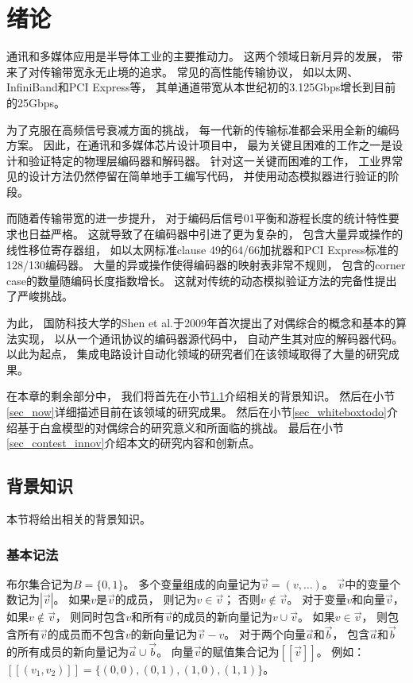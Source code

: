 \chapter{绪论}
\label{chap:1}

通讯和多媒体应用是半导体工业的主要推动力。
这两个领域日新月异的发展，
带来了对传输带宽永无止境的追求。
常见的高性能传输协议，
如以太网、InfiniBand和PCI Express等，
其单通道带宽从本世纪初的3.125Gbps增长到目前的25Gbps。

为了克服在高频信号衰减方面的挑战，
每一代新的传输标准都会采用全新的编码方案。
因此，在通讯和多媒体芯片设计项目中，
最为关键且困难的工作之一是设计和验证特定的物理层编码器和解码器。
针对这一关键而困难的工作，
工业界常见的设计方法仍然停留在简单地手工编写代码，
并使用动态模拟器进行验证的阶段。

而随着传输带宽的进一步提升，
对于编码后信号01平衡和游程长度的统计特性要求也日益严格。
这就导致了在编码器中引进了更为复杂的，
包含大量异或操作的线性移位寄存器组，
如以太网标准clause 49的64/66加扰器和PCI Express标准的128/130编码器。
大量的异或操作使得编码器的映射表非常不规则，
包含的corner case的数量随编码长度指数增长。
这就对传统的动态模拟验证方法的完备性提出了严峻挑战。

为此，
国防科技大学的Shen et al.于2009年首次提出了对偶综合的概念和基本的算法实现，
以从一个通讯协议的编码器源代码中，
自动产生其对应的解码器代码。
以此为起点，
集成电路设计自动化领域的研究者们在该领域取得了大量的研究成果。

在本章的剩余部分中，
我们将首先在小节\ref{sec_back}介绍相关的背景知识。
然后在小节\ref{sec_now}详细描述目前在该领域的研究成果。
然后在小节\ref{sec_whiteboxtodo}介绍基于白盒模型的对偶综合的研究意义和所面临的挑战。
最后在小节\ref{sec_contest_innov}介绍本文的研究内容和创新点。


\section{背景知识}\label{sec_back}
本节将给出相关的背景知识。

\subsection{基本记法}
布尔集合记为$B=\{0,1\}$。
多个变量组成的向量记为$\vec{v}=(v,\dots)$。
$\vec{v}$中的变量个数记为$|\vec{v}|$。
如果$v$是$\vec{v}$的成员，
则记为$v\in\vec{v}$；
否则$v\notin\vec{v}$。
对于变量$v$和向量$\vec{v}$，
如果$v\notin\vec{v}$，
则同时包含$v$和所有$\vec{v}$的成员的新向量记为$v\cup\vec{v}$。
如果$v\in \vec{v}$，
则包含所有$\vec{v}$的成员而不包含$v$的新向量记为$\vec{v}-v$。
对于两个向量$\vec{a}$和$\vec{b}$，
包含$\vec{a}$和$\vec{b}$的所有成员的新向量记为$\vec{a}\cup\vec{b}$。
向量$\vec{v}$的赋值集合记为$[\![\vec{v}]\!]$。
例如：
$[\![(v_1,v_2)]\!]=\{(0,0),(0,1),(1,0),(1,1)\}$。

